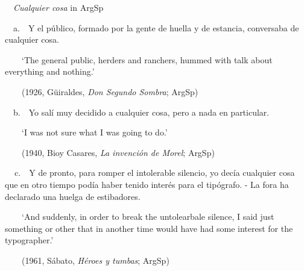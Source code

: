 \begin{listWWNumxleveli}
\item 
\end{listWWNumxleveli}
\begin{styleStandard}
\ \ \textit{Cualquier cosa} in ArgSp
\end{styleStandard}

\begin{styleStandard}
\ \ a.\ \ Y el público, formado por la gente de huella y de estancia, conversaba de cualquier cosa.
\end{styleStandard}

\begin{styleStandard}
\ \ \ \ ‘The general public, herders and ranchers, hummed with talk about everything and nothing.’
\end{styleStandard}

\begin{styleStandard}
\ \ \ \ (1926, Güiraldes, \textit{Don Segundo Sombra}; ArgSp)
\end{styleStandard}

\begin{styleStandard}
\ \ b.\ \ Yo salí muy decidido a cualquier cosa, pero a nada en particular.
\end{styleStandard}

\begin{styleStandard}
\ \ \ \ ‘I was not sure what I was going to do.’
\end{styleStandard}

\begin{styleStandard}
\ \ \ \ (1940, Bioy Casares, \textit{La invención de Morel}; ArgSp)
\end{styleStandard}

\begin{styleStandard}
\textbf{\ \ }c.\ \ Y de pronto, para romper el intolerable silencio, yo decía cualquier cosa que en otro tiempo podía haber tenido interés para el tipógrafo. - La fora ha declarado una huelga de estibadores.
\end{styleStandard}

\begin{styleStandard}
\ \ \ \ ‘And suddenly, in order to break the untolearbale silence, I said just something or other that in another time would have had some interest for the typographer.’
\end{styleStandard}

\begin{styleStandard}
\ \ \ \ (1961,\textit{ }Sábato, \textit{Héroes y tumbas}; ArgSp)
\end{styleStandard}

